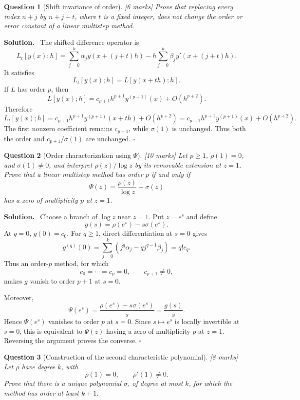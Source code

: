 \documentclass[11pt,a4paper]{article}
\theoremstyle{questionstyle}
\newtheorem{question}{Question}
\newenvironment{solution}
  {\par\noindent\textbf{\color{solutiongreen}Solution.}\ }
  {\hfill$\square$\par}
\newcommand{\pointmark}[1]{\hfill\textnormal{\textit{[#1 marks]}}}
\begin{document}
\begin{question}[Shift invariance of order]\pointmark{6}
Prove that replacing every index \(n+j\) by \(n+j+t\), where \(t\) is
a fixed integer, does not change the order or error constant of a
linear multistep method.
\end{question}

\begin{solution}
The shifted difference operator is
\[
  L_t[y(x);h]
  =\sum_{j=0}^{k}\alpha_jy(x+(j+t)h)
  -h\sum_{j=0}^{k}\beta_jy'(x+(j+t)h).
\]
It satisfies
\[
  L_t[y(x);h]=L[y(x+th);h].
\]
If \(L\) has order \(p\), then
\[
  L[y(x);h]
  =c_{p+1}h^{p+1}y^{(p+1)}(x)+O(h^{p+2}).
\]
Therefore
\[
  L_t[y(x);h]
  =c_{p+1}h^{p+1}y^{(p+1)}(x+th)+O(h^{p+2})
  =c_{p+1}h^{p+1}y^{(p+1)}(x)+O(h^{p+2}).
\]
The first nonzero coefficient remains \(c_{p+1}\), while
\(\sigma(1)\) is unchanged.  Thus both the order and
\(c_{p+1}/\sigma(1)\) are unchanged.
\end{solution}

\begin{question}[Order characterization using \(\Psi\)]\pointmark{10}
Let \(p\geq1\), \(\rho(1)=0\), and \(\sigma(1)\neq0\), and interpret
\(\rho(z)/\log z\) by its removable extension at \(z=1\).  Prove that
a linear multistep method has order \(p\) if and only if
\[
  \Psi(z)=\frac{\rho(z)}{\log z}-\sigma(z)
\]
has a zero of multiplicity \(p\) at \(z=1\).
\end{question}

\begin{solution}
Choose a branch of \(\log z\) near \(z=1\).  Put \(z=e^s\) and define
\[
  g(s)=\rho(e^s)-s\sigma(e^s).
\]
At \(q=0\), \(g(0)=c_0\).  For \(q\geq1\), direct differentiation at
\(s=0\) gives
\[
  g^{(q)}(0)
  =\sum_{j=0}^{k}\left(j^q\alpha_j
  -qj^{q-1}\beta_j\right)=q!c_q.
\]
Thus an order-\(p\) method, for which
\[
  c_0=\cdots=c_p=0,\qquad c_{p+1}\neq0,
\]
makes \(g\) vanish to order \(p+1\) at \(s=0\).

Moreover,
\[
  \Psi(e^s)
  =\frac{\rho(e^s)-s\sigma(e^s)}{s}
  =\frac{g(s)}s.
\]
Hence \(\Psi(e^s)\) vanishes to order \(p\) at \(s=0\).  Since
\(s\mapsto e^s\) is locally invertible at \(s=0\), this is equivalent
to \(\Psi(z)\) having a zero of multiplicity \(p\) at \(z=1\).
Reversing the argument proves the converse.
\end{solution}

\begin{question}[Construction of the second characteristic polynomial]\pointmark{8}
Let \(\rho\) have degree \(k\), with
\[
  \rho(1)=0,\qquad \rho'(1)\neq0.
\]
Prove that there is a unique polynomial \(\sigma\), of degree at most
\(k\), for which the method has order at least \(k+1\).
\end{question}
\end{document}
